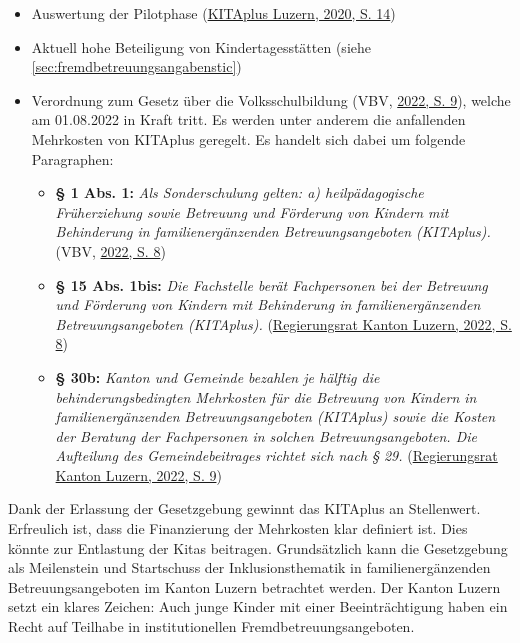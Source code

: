 \documentclass[
  ngerman,
  11pt,
  paper=a4,
  twoside,
  titlepage=true,
  openright,
  abstract=on,
  toc=listofnumbered,
  numbers=noenddot,
  chapterprefix=true,
  headings=optiontohead,
  svgnames,
  dvipsnames]{scrreprt}
\begin{document}
\begin{itemize}
\item
  Auswertung der Pilotphase
  (\protect\hyperlink{ref-konzeptKitaPlus}{KITAplus Luzern, 2020, S.
  14})
\item
  Aktuell hohe Beteiligung von Kindertagesstätten (siehe
  \cref{sec:fremdbetreuungsangabenstic})
\item
  Verordnung zum Gesetz über die Volksschulbildung (VBV,
  \protect\hyperlink{ref-volksschulbildungsverordnung}{2022, S. 9}),
  welche am 01.08.2022 in Kraft tritt. Es werden unter anderem die
  anfallenden Mehrkosten von KITAplus geregelt. Es handelt sich dabei um
  folgende Paragraphen:

  \begin{itemize}
  \item
    \textbf{§ 1 Abs. 1:} \emph{Als Sonderschulung gelten: a)
    heilpädagogische Früherziehung sowie Betreuung und Förderung von
    Kindern mit Behinderung in familienergänzenden Betreuungsangeboten
    (KITAplus).} (VBV,
    \protect\hyperlink{ref-volksschulbildungsverordnung}{2022, S. 8})
  \item
    \textbf{§ 15 Abs. 1bis:} \emph{Die Fachstelle berät Fachpersonen bei
    der Betreuung und Förderung von Kindern mit Behinderung in
    familienergänzenden Betreuungsangeboten (KITAplus).}
    (\protect\hyperlink{ref-volksschulbildungsverordnung}{Regierungsrat
    Kanton Luzern, 2022, S. 8})
  \item
    \textbf{§ 30b:} \emph{Kanton und Gemeinde bezahlen je hälftig die
    behinderungsbedingten Mehrkosten für die Betreuung von Kindern in
    familienergänzenden Betreuungsangeboten (KITAplus) sowie die Kosten
    der Beratung der Fachpersonen in solchen Betreuungsangeboten. Die
    Aufteilung des Gemeindebeitrages richtet sich nach § 29.}
    (\protect\hyperlink{ref-volksschulbildungsverordnung}{Regierungsrat
    Kanton Luzern, 2022, S. 9})
  \end{itemize}
\end{itemize}

Dank der Erlassung der Gesetzgebung gewinnt das KITAplus an Stellenwert.
Erfreulich ist, dass die Finanzierung der Mehrkosten klar definiert ist.
Dies könnte zur Entlastung der Kitas beitragen. Grundsätzlich kann die
Gesetzgebung als Meilenstein und Startschuss der Inklusionsthematik in
familienergänzenden Betreuungsangeboten im Kanton Luzern betrachtet
werden. Der Kanton Luzern setzt ein klares Zeichen: Auch junge Kinder
mit einer Beeinträchtigung haben ein Recht auf Teilhabe in
institutionellen Fremdbetreuungsangeboten.
\end{document}
